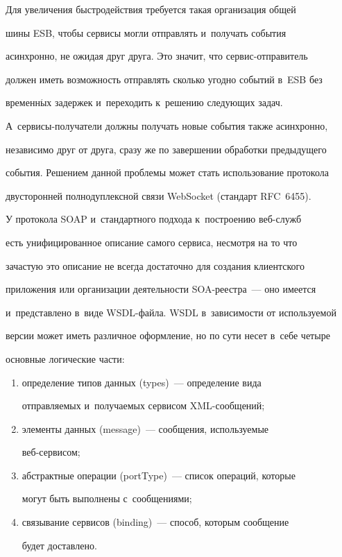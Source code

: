      Для увеличения быстродействия требуется такая организация общей 


шины ESB, чтобы сервисы могли отправлять и~получать события 


асинхронно, не ожидая друг друга. Это значит, что сер\-вис-от\-пра\-ви\-тель 


должен иметь возможность отправлять сколько угодно событий в~ESB без 


временн$\acute{\mbox{ы}}$х задержек и~переходить к~решению следующих задач.  


А~сер\-ви\-сы-по\-лу\-ча\-те\-ли должны получать новые события также асинхронно, 


независимо друг от друга, сразу же по завершении обработки предыдущего 


события. Решением данной проблемы может стать использование протокола 


двусторонней полнодуплексной связи WebSocket (стандарт RFC~6455).


     


     У протокола SOAP и~стандартного подхода к~построению веб-служб 


есть унифицированное описание самого сервиса, несмотря на то что 


зачастую это описание не всегда достаточно для создания клиентского 


приложения или организации деятельности SOA-ре\-естра~--- оно имеется 


и~представлено в~виде WSDL-фай\-ла. WSDL в~зависимости от используемой 


версии может иметь различное оформление, но по сути несет в~себе четыре 


основные логические части: 


     \begin{enumerate}[(1)]


     \item определение типов данных (types)~--- определение вида 


отправляемых и~получаемых сервисом XML-сообщений;


     \item элементы данных (message)~--- сообщения, используемые  


веб-сервисом;


     \item абстрактные операции (portType)~--- список операций, которые 


могут быть выполнены с~сообщениями;


     \item связывание сервисов (binding)~--- способ, которым сообщение 


будет до\-став\-лено.


     \end{enumerate}


